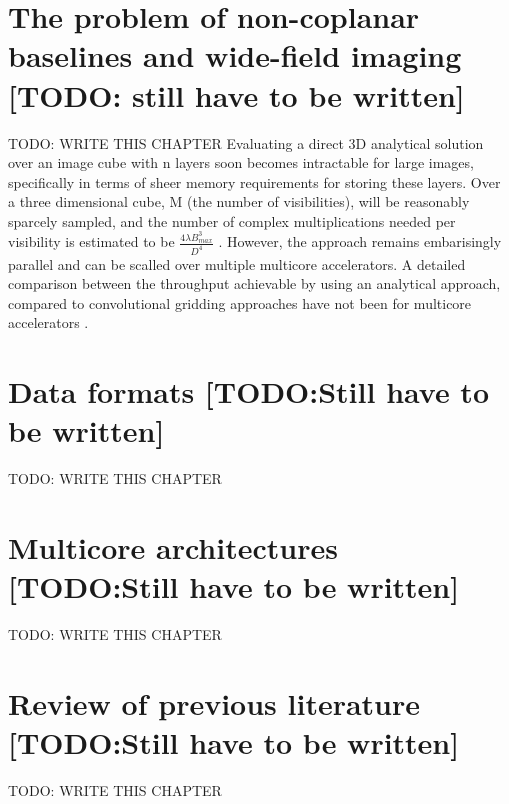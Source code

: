  \section{The problem of non-coplanar baselines and wide-field imaging [TODO: still have to be written]}
 {\color{red} TODO: WRITE THIS CHAPTER}
 Evaluating a direct 3D analytical solution over an image cube with n layers soon becomes intractable for large images, specifically in terms of sheer memory requirements for storing these layers. Over a three dimensional cube, M (the number of visibilities),
 will be reasonably sparcely sampled, and the number of complex multiplications needed per visibility is estimated to be $\frac{4\lambda B_{max}^3}{D^4}$ \cite{yashar2009tdp}. However, the approach remains embarisingly parallel and can
 be scalled over multiple multicore accelerators. A detailed comparison between the throughput achievable by using an analytical approach, compared to convolutional gridding approaches have not been for multicore accelerators \cite{hardy2013direct}.
 \section{Data formats [TODO:Still have to be written]}
 {\color{red} TODO: WRITE THIS CHAPTER}
 \section{Multicore architectures [TODO:Still have to be written]}
 {\color{red} TODO: WRITE THIS CHAPTER}
 \section{Review of previous literature [TODO:Still have to be written]}
 {\color{red} TODO: WRITE THIS CHAPTER}        
